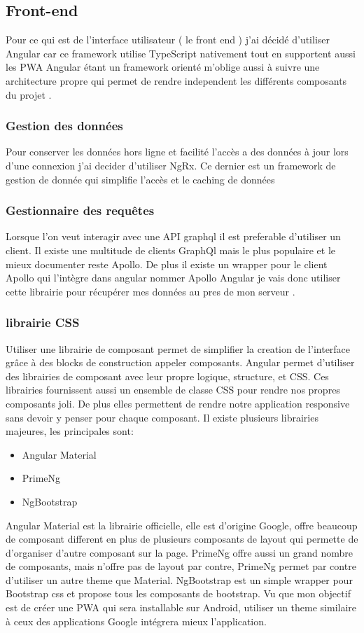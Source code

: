 \subsection{Front-end}\label{subsec:front-end}
Pour ce qui est de l'interface utilisateur ( le front end ) j'ai décidé d'utiliser Angular car ce framework utilise TypeScript nativement tout en supportent aussi les PWA
Angular étant un framework orienté m'oblige aussi à suivre une architecture propre qui permet de rendre independent les différents composants du projet .

\subsubsection{Gestion des données}
Pour conserver les données hors ligne et facilité l'accès a des données à jour lors d'une connexion j'ai decider d'utiliser NgRx.
Ce dernier est un framework de gestion de donnée qui simplifie l'accès et le caching de données
\subsubsection{Gestionnaire des requêtes}
Lorsque l'on veut interagir avec une API graphql il est preferable d'utiliser un client.
Il existe une multitude de clients GraphQl mais le plus populaire et le mieux documenter reste Apollo.
De plus il existe un wrapper pour le client Apollo qui l'intègre dans angular nommer Apollo Angular
je vais donc utiliser cette librairie pour récupérer mes données au pres de mon serveur .
\subsubsection{librairie CSS}
Utiliser une librairie de composant permet de simplifier la creation de l'interface grâce à des blocks de construction appeler composants\@.
Angular permet d'utiliser des librairies de composant avec leur propre logique, structure, et CSS\@.
Ces librairies fournissent aussi un ensemble de classe CSS pour rendre nos propres composants joli.
De plus elles permettent de rendre notre application responsive sans devoir y penser pour chaque composant.
Il existe plusieurs librairies majeures, les principales sont:
\begin{itemize}
    \item Angular Material
    \item PrimeNg
    \item NgBootstrap
\end{itemize}
Angular Material est la librairie officielle, elle est d'origine Google,
offre beaucoup de composant different en plus de plusieurs composants de layout qui permette de d'organiser d'autre composant sur la page.
PrimeNg offre aussi un grand nombre de composants, mais n'offre pas de layout par contre,
PrimeNg permet par contre d'utiliser un autre theme que Material.
NgBootstrap est un simple wrapper pour Bootstrap css et propose tous les composants de bootstrap.
Vu que mon objectif est de créer une PWA qui sera installable sur Android,
utiliser un theme similaire à ceux des applications Google intégrera mieux l'application.

